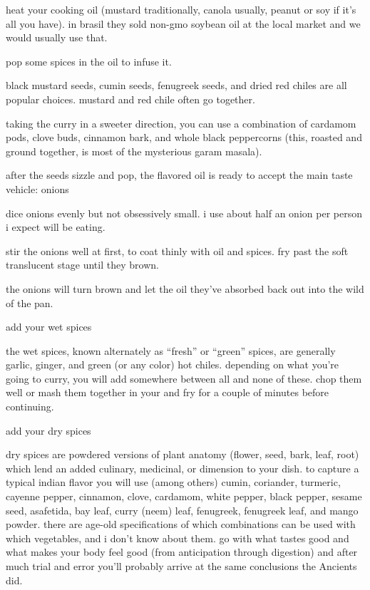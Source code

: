 \begin{algorithm}
  \item heat your cooking oil (mustard traditionally, canola usually, peanut or 
  soy if it's all you have). in brasil they sold non-gmo soybean oil at the 
  local market and we would usually use that.

  \item pop some spices in the oil to infuse it.
  
  black mustard seeds, cumin seeds, fenugreek seeds, and dried red chiles are 
  all popular choices. mustard and red chile often go together.

  taking the curry in a sweeter direction, you can use a combination of 
  cardamom pods, clove buds, cinnamon bark, and whole black peppercorns (this, 
  roasted and ground together, is most of the mysterious garam masala).

  \item after the seeds sizzle and pop, the flavored oil is ready to accept the 
  main taste vehicle: onions
  
  dice onions evenly but not obsessively small. i use about half an onion per 
  person i expect will be eating.

  stir the onions well at first, to coat thinly with oil and spices. fry past 
  the soft translucent stage until they brown.

  the onions will turn brown and let the oil they've absorbed back out into the 
  wild of the pan.

  \item add your wet spices 

  the wet spices, known alternately as ``fresh'' or ``green'' spices, are 
  generally garlic, ginger, and green (or any color) hot chiles. depending on 
  what you're going to curry, you will add somewhere between all and none of 
  these. chop them well or mash them together in your  and fry for a 
  couple of minutes before continuing.

  \item add your dry spices

  dry spices are powdered versions of plant anatomy (flower, seed, bark, leaf, 
  root) which lend an added culinary, medicinal, or  dimension to your 
  dish. to capture a typical indian flavor you will use (among others) cumin, 
  coriander, turmeric, cayenne pepper, cinnamon, clove, cardamom, white pepper, 
  black pepper, sesame seed, asafetida, bay leaf, curry (neem) leaf, fenugreek, 
  fenugreek leaf, and mango powder. there are age-old specifications of which 
  combinations can be used with which vegetables, and i don't know  
  about them. go with what tastes good and what makes your body feel good (from 
  anticipation through digestion) and after much trial and error you'll 
  probably arrive at the same conclusions the Ancients did.


\end{algorithm}
